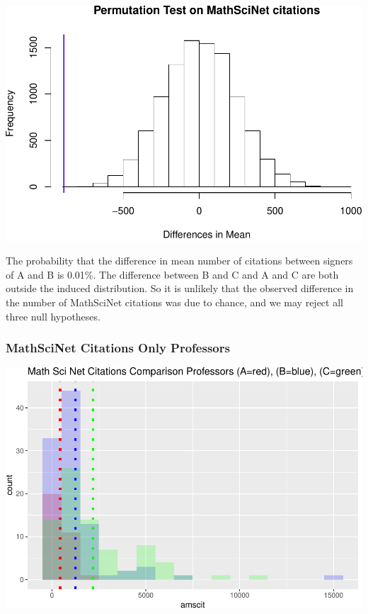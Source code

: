 \documentclass[]{article}
\begin{document}
\includegraphics{final_files/figure-latex/unnamed-chunk-27-1.pdf}

The probability that the difference in mean number of citations between
signers of A and B is 0.01\%. The difference between B and C and A and C
are both outside the induced distribution. So it is unlikely that the
observed difference in the number of MathSciNet citations was due to
chance, and we may reject all three null hypotheses.

\hypertarget{mathscinet-citations-only-professors}{%
\subsubsection{MathSciNet Citations Only
Professors}\label{mathscinet-citations-only-professors}}

\includegraphics{final_files/figure-latex/unnamed-chunk-29-1.pdf}
\end{document}
